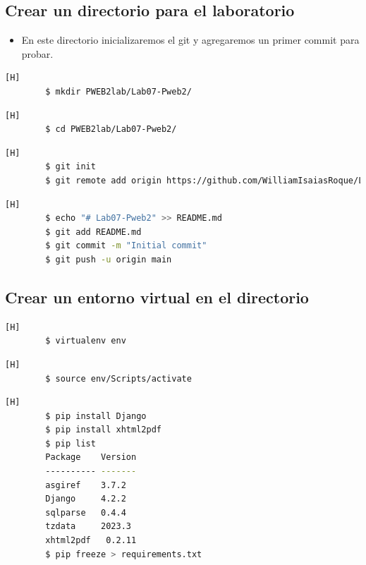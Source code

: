 \documentclass{article}
\begin{document}
	\subsection{Crear un directorio para el laboratorio}
	\begin{itemize}	
		\item En este directorio inicializaremos el git y agregaremos un primer commit para probar.
	\end{itemize}	

        \begin{lstlisting}[language=bash,caption={Creando directorio de trabajo y accediendo en él}][H]
		$ mkdir PWEB2lab/Lab07-Pweb2/
	\end{lstlisting}
	\begin{lstlisting}[language=bash,caption={Dirijiéndonos al directorio de trabajo}][H]
		$ cd PWEB2lab/Lab07-Pweb2/
	\end{lstlisting}	
	\begin{lstlisting}[language=bash,caption={Inicializando el repositorio Git y agregando remote add origin}][H]
		$ git init
		$ git remote add origin https://github.com/WilliamIsaiasRoque/Lab07-Pweb2.git
	\end{lstlisting}
        \begin{lstlisting}[language=bash,caption={Añadiendo un README.md como primer push}][H]
		$ echo "# Lab07-Pweb2" >> README.md
		$ git add README.md
		$ git commit -m "Initial commit"
		$ git push -u origin main
	\end{lstlisting}

        \subsection{Crear un entorno virtual en el directorio}
        \begin{lstlisting}[language=bash,caption={Creando el directorio django\_env y accediendo en esa carpeta}][H]
		$ virtualenv env
	\end{lstlisting}        	
        \begin{lstlisting}[language=bash,caption={Activando el entorno virtual con source}][H]
		$ source env/Scripts/activate
	\end{lstlisting} 
        \begin{lstlisting}[language=bash,caption={Instalando Django y xhtml2pdf (es una herramienta que convierte documentos XHTML a formato PDF.). Luego guardamos las versiones en un requirements.txt}][H]
        $ pip install Django
        $ pip install xhtml2pdf
        $ pip list
        Package    Version
        ---------- -------
        asgiref    3.7.2
        Django     4.2.2
        sqlparse   0.4.4
        tzdata     2023.3
        xhtml2pdf   0.2.11
        $ pip freeze > requirements.txt
	\end{lstlisting}
 
\end{document}
